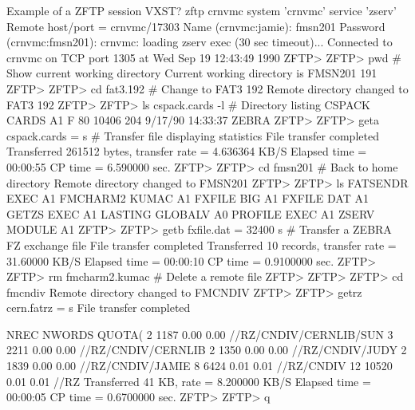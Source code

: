 \begin{XMPt}{Example of a ZFTP session}
VXST? zftp crnvmc
system 'crnvmc' service 'zserv'
Remote host/port = crnvmc/17303
Name (crnvmc:jamie):
fmsn201
Password (crnvmc:fmsn201):
crnvmc: loading zserv exec (30 sec timeout)...
Connected to crnvmc on TCP port 1305 at Wed Sep 19 12:43:49 1990
ZFTP>
ZFTP> pwd # Show current working directory
Current working directory is FMSN201 191
ZFTP>
ZFTP> cd fat3.192 # Change to FAT3 192
Remote directory changed to FAT3 192
ZFTP>
ZFTP> ls cspack.cards -l # Directory listing
CSPACK   CARDS    A1 F         80      10406        204  9/17/90 14:33:37 ZEBRA
ZFTP>
ZFTP> geta cspack.cards = s # Transfer file displaying statistics
 File transfer completed
 Transferred       261512 bytes, transfer rate =    4.636364     KB/S
 Elapsed time = 00:00:55 CP time =    6.590000     sec.
ZFTP>
ZFTP> cd fmsn201 # Back to home directory
Remote directory changed to FMSN201
ZFTP>
ZFTP> ls
FATSENDR EXEC     A1
FMCHARM2 KUMAC    A1
FXFILE   BIG      A1
FXFILE   DAT      A1
GETZS    EXEC     A1
LASTING  GLOBALV  A0
PROFILE  EXEC     A1
ZSERV    MODULE   A1
ZFTP>
ZFTP> getb fxfile.dat = 32400 s # Transfer a ZEBRA FZ exchange file
 File transfer completed
 Transferred           10 records, transfer rate =    31.60000     KB/S
 Elapsed time = 00:00:10 CP time =   0.9100000     sec.
ZFTP>
ZFTP> rm fmcharm2.kumac # Delete a remote file
ZFTP>
ZFTP>
ZFTP> cd fmcndiv
Remote directory changed to FMCNDIV
ZFTP>
ZFTP> getrz cern.fatrz = s
File transfer completed


     NREC    NWORDS    QUOTA(%
       2       1187      0.00     0.00   //RZ/CNDIV/CERNLIB/SUN
       3       2211      0.00     0.00   //RZ/CNDIV/CERNLIB
       2       1350      0.00     0.00   //RZ/CNDIV/JUDY
       2       1839      0.00     0.00   //RZ/CNDIV/JAMIE
       8       6424      0.01     0.01   //RZ/CNDIV
      12      10520      0.01     0.01   //RZ
 Transferred           41 KB, rate =    8.200000     KB/S
 Elapsed time = 00:00:05 CP time =   0.6700000     sec.
ZFTP>
ZFTP> q
\end{XMPt}
\newpage

